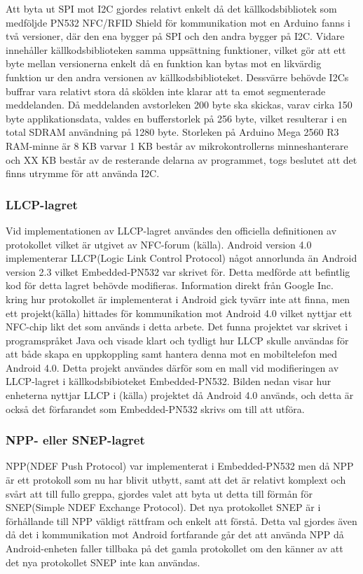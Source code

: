 \documentclass[11pt]{article}
\begin{document}
Att byta ut SPI mot I2C gjordes relativt enkelt då det källkodsbibliotek som medföljde PN532 NFC/RFID Shield för kommunikation mot en Arduino fanns i två versioner, där den ena bygger på SPI och den andra bygger på I2C. Vidare innehåller källkodsbiblioteken samma uppsättning funktioner, vilket gör att ett byte mellan versionerna enkelt då en funktion kan bytas mot en likvärdig funktion ur den andra versionen av källkodsbiblioteket. Dessvärre behövde I2Cs buffrar vara relativt stora då skölden inte klarar att ta emot segmenterade meddelanden. Då meddelanden avstorleken 200 byte ska skickas, varav cirka 150 byte applikationsdata, valdes en bufferstorlek på 256 byte, vilket resulterar i en total SDRAM användning på 1280 byte. Storleken på Arduino Mega 2560 R3 RAM-minne är 8 KB varvar 1 KB består av mikrokontrollerns minneshanterare och XX KB består av de resterande delarna av programmet, togs beslutet att det finns utrymme för att använda I2C.

\subsubsection{LLCP-lagret}
Vid implementationen av LLCP-lagret användes den officiella definitionen av protokollet vilket är utgivet av NFC-forum (källa). Android version 4.0 implementerar LLCP(Logic Link Control Protocol) något annorlunda än Android version 2.3 vilket Embedded-PN532 var skrivet för. Detta medförde att befintlig kod för detta lagret behövde modifieras. Information direkt från Google Inc. kring hur protokollet är implementerat i Android gick tyvärr inte att finna, men ett projekt(källa) hittades för kommunikation mot Android 4.0 vilket nyttjar ett NFC-chip likt det som används i detta arbete. Det funna projektet var skrivet i programspråket Java och visade klart och tydligt hur LLCP skulle användas för att både skapa en uppkoppling samt hantera denna mot en mobiltelefon med Android 4.0. Detta projekt användes därför som en mall vid modifieringen av LLCP-lagret i källkodsbibioteket Embedded-PN532. Bilden nedan visar hur enheterna nyttjar LLCP i (källa) projektet då Android 4.0 används, och detta är också det förfarandet som Embedded-PN532 skrivs om till att utföra.


\subsubsection{NPP- eller SNEP-lagret}
NPP(NDEF Push Protocol) var implementerat i Embedded-PN532 men då NPP är ett protokoll som nu har blivit utbytt, samt att det är relativt komplext och svårt att till fullo greppa, gjordes valet att byta ut detta till förmån för SNEP(Simple NDEF Exchange Protocol). Det nya protokollet SNEP är i förhållande till NPP väldigt rättfram och enkelt att förstå. Detta val gjordes även då det i kommunikation mot Android fortfarande går det att använda NPP då Android-enheten faller tillbaka på det gamla protokollet om den känner av att det nya protokollet SNEP inte kan användas. 
\end{document}

